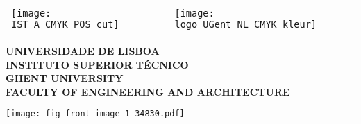 \begin{center}
    \vspace*{-2.0cm}
    \setlength{\tabcolsep}{0pt}
    \begin{tabular}{>{\raggedleft}m{5cm}>{\centering}m{\dimexpr\textwidth - 10cm\relax}>{\raggedright}m{5cm}}
    \texttt{[image: IST\_A\_CMYK\_POS\_cut]}%
    &
    &%
    \texttt{[image: logo\_UGent\_NL\_CMYK\_kleur]} %
    \end{tabular}
    \textbf{\large UNIVERSIDADE DE LISBOA} \\[5pt]%
    \textbf{\large INSTITUTO SUPERIOR TÉCNICO}\\[20pt]
    \textbf{\large GHENT UNIVERSITY} \\[5pt]%
    \textbf{\large FACULTY OF ENGINEERING AND ARCHITECTURE}%



    
    

\vspace{1.0cm}
\texttt{[image: fig\_front\_image\_1\_34830.pdf]}


\end{center}
